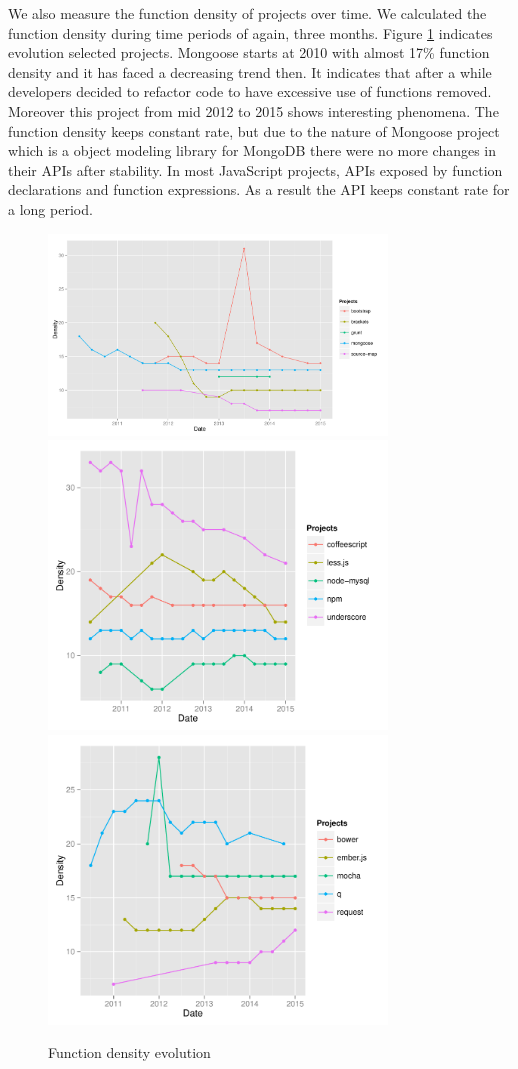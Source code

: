 We also measure the function density of projects over time. We calculated the function density during time periods of again, three months.
Figure \ref{fig:function_density} indicates evolution selected projects. Mongoose starts at 2010 with almost 17\% function density and it has faced a decreasing trend then. It indicates that after a while developers decided to refactor code to have excessive use of functions removed. Moreover this project from mid 2012 to 2015 shows interesting phenomena. The function density keeps constant rate, but due to the nature of Mongoose project which is a object modeling library for MongoDB there were no more changes in their APIs after stability. In most JavaScript projects, APIs exposed by function declarations and function expressions. As a result the API keeps constant rate for a long period. 
\begin{figure}[thb!]
	\caption{Function density evolution}
	\label{fig:function_density}
	\includegraphics[width=90mm,scale=0.5]{figures/function_density}
	\includegraphics[width=90mm,scale=0.5]{figures/function_density_2}
	\includegraphics[width=90mm,scale=0.5]{figures/function_density_3}
\end{figure}

